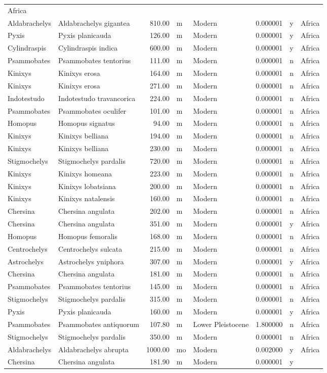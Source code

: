 \begin{landscape}
\begin{longtable}[]{@{}llrllrll@{}}
	Africa\tabularnewline
	Aldabrachelys & Aldabrachelys gigantea & 810.00 & m & Modern & 0.000001
	& y & Africa\tabularnewline
	Pyxis & Pyxis planicauda & 126.00 & m & Modern & 0.000001 & y &
	Africa\tabularnewline
	Cylindraspis & Cylindraspis indica & 600.00 & m & Modern & 0.000001 & y
	& Africa\tabularnewline
	Psammobates & Psammobates tentorius & 111.00 & m & Modern & 0.000001 & n
	& Africa\tabularnewline
	Kinixys & Kinixys erosa & 164.00 & m & Modern & 0.000001 & n &
	Africa\tabularnewline
	Kinixys & Kinixys erosa & 271.00 & m & Modern & 0.000001 & n &
	Africa\tabularnewline
	Indotestudo & Indotestudo travancorica & 224.00 & m & Modern & 0.000001
	& n & Africa\tabularnewline
	Psammobates & Psammobates oculifer & 101.00 & m & Modern & 0.000001 & n
	& Africa\tabularnewline
	Homopus & Homopus signatus & 94.00 & m & Modern & 0.000001 & n &
	Africa\tabularnewline
	Kinixys & Kinixys belliana & 194.00 & m & Modern & 0.000001 & n &
	Africa\tabularnewline
	Kinixys & Kinixys belliana & 230.00 & m & Modern & 0.000001 & n &
	Africa\tabularnewline
	Stigmochelys & Stigmochelys pardalis & 720.00 & m & Modern & 0.000001 &
	n & Africa\tabularnewline
	Kinixys & Kinixys homeana & 223.00 & m & Modern & 0.000001 & n &
	Africa\tabularnewline
	Kinixys & Kinixys lobatsiana & 200.00 & m & Modern & 0.000001 & n &
	Africa\tabularnewline
	Kinixys & Kinixys natalensis & 160.00 & m & Modern & 0.000001 & n &
	Africa\tabularnewline
	Chersina & Chersina angulata & 202.00 & m & Modern & 0.000001 & n &
	Africa\tabularnewline
	Chersina & Chersina angulata & 351.00 & m & Modern & 0.000001 & y &
	Africa\tabularnewline
	Homopus & Homopus femoralis & 168.00 & m & Modern & 0.000001 & n &
	Africa\tabularnewline
	Centrochelys & Centrochelys sulcata & 215.00 & m & Modern & 0.000001 & n
	& Africa\tabularnewline
	Astrochelys & Astrochelys yniphora & 307.00 & m & Modern & 0.000001 & y
	& Africa\tabularnewline
	Chersina & Chersina angulata & 181.00 & m & Modern & 0.000001 & n &
	Africa\tabularnewline
	Psammobates & Psammobates tentorius & 145.00 & m & Modern & 0.000001 & n
	& Africa\tabularnewline
	Stigmochelys & Stigmochelys pardalis & 315.00 & m & Modern & 0.000001 &
	n & Africa\tabularnewline
	Pyxis & Pyxis planicauda & 160.00 & m & Modern & 0.000001 & y &
	Africa\tabularnewline
	Psammobates & Psammobates antiquorum & 107.80 & m & Lower Pleistocene &
	1.800000 & n & Africa\tabularnewline
	Stigmochelys & Stigmochelys pardalis & 350.00 & m & Modern & 0.000001 &
	n & Africa\tabularnewline
	Aldabrachelys & Aldabrachelys abrupta & 1000.00 & mo & Modern & 0.002000
	& y & Africa\tabularnewline
	Chersina & Chersina angulata & 181.90 & m & Modern & 0.000001 & y &

\end{longtable}
\end{landscape}
